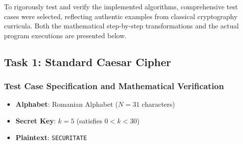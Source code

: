 \documentclass[12pt,a4paper]{article}
\begin{document}
To rigorously test and verify the implemented algorithms, comprehensive test cases were selected, reflecting authentic examples from classical cryptography curricula. Both the mathematical step-by-step transformations and the actual program executions are presented below.

\subsection{Task 1: Standard Caesar Cipher}

\subsubsection{Test Case Specification and Mathematical Verification}
\begin{itemize}
    \item \textbf{Alphabet}: Romanian Alphabet ($N = 31$ characters)
    \item \textbf{Secret Key}: $k = 5$ (satisfies $0 < k < 30$)
    \item \textbf{Plaintext}: \texttt{SECURITATE}
\end{itemize}

\begin{table}[H]
\centering
\caption{Mathematical step-by-step verification of Task 1 encryption and decryption}
\label{tab:task1_math}
\end{table}
\end{document}

